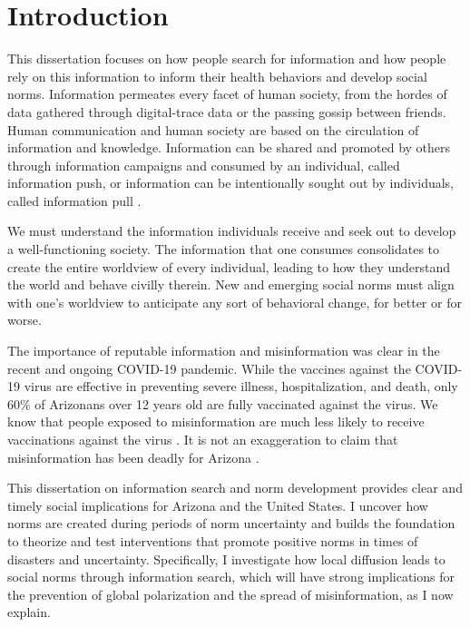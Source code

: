 \hypertarget{intro}
{\chapter{Introduction}\label{intro}}

This dissertation focuses on how people search for information and how people
rely on this information to inform their health behaviors and develop social
norms. Information permeates every facet of human society, from the hordes of
data gathered through digital-trace data or the passing gossip between friends.
Human communication and human society are based on the circulation of
information and knowledge. Information can be shared and promoted by others
through information campaigns and consumed by an individual, called information
push, or information can be intentionally sought out by individuals, called
information pull \citep{cybenkoFoundationsInformationPush1999}.

We must understand the information individuals receive and seek out to develop a
well-functioning society. The information that one consumes consolidates to
create the entire worldview of every individual, leading to how they understand
the world and behave civilly therein. New and emerging social norms must align
with one's worldview to anticipate any sort of behavioral change, for better or
for worse.

The importance of reputable information and misinformation was clear in the
recent and ongoing COVID-19 pandemic. While the vaccines against the COVID-19
virus are effective in preventing severe illness, hospitalization, and death,
only 60\% of Arizonans over 12 years old \citep{owid} are fully vaccinated
against the virus. We know that people exposed to misinformation are much less
likely to receive vaccinations against the virus
\citep{loombaMeasuringImpactCOVID192021}. It is not an exaggeration to claim
that misinformation has been deadly for Arizona
\citep{pathakInfodemicsCOVID19Role2020, greene_murphy21}.

This dissertation on information search and norm development provides clear and
timely social implications for Arizona and the United States. I uncover how
norms are created during periods of norm uncertainty and builds the foundation
to theorize and test interventions that promote positive norms in times of
disasters and uncertainty. Specifically, I investigate how local diffusion leads
to social norms through information search, which will have strong implications
for the prevention of global polarization and the spread of misinformation, as I
now explain.

